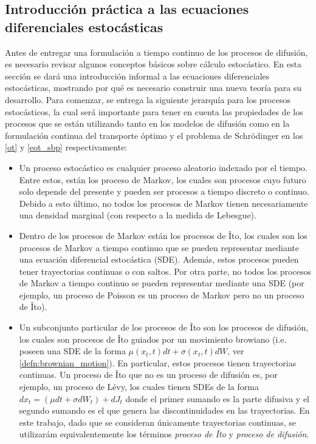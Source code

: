 \subsection{Introducción práctica a las ecuaciones diferenciales estocásticas}
\label{dm/continuous_dm/sdes_introduction}


Antes de entregar una formulación a tiempo continuo de los procesos de difusión, es necesario revisar algunos conceptos básicos sobre cálculo estocástico. En esta sección se dará una introducción informal a las ecuaciones diferenciales estocásticas, mostrando por qué es necesario construir una nueva teoría para su desarrollo. Para comenzar, se entrega la siguiente jerarquía para los procesos estocásticos, la cual será importante para tener en cuenta las propiedades de los procesos que se están utilizando tanto en los modelos de difusión como en la formulación continua del transporte óptimo y el problema de Schrödinger en los \autoref{ot} y \autoref{eot_sbp} respectivamente:


\begin{itemize}
    \item Un proceso estocástico es cualquier proceso aleatorio indexado por el tiempo. Entre estos, están los proceso de Markov, los cuales son procesos cuyo futuro solo depende del presente y pueden ser procesos a tiempo discreto o continuo. Debido a esto último, no todos los procesos de Markov tienen necesariamente una densidad marginal (con respecto a la medida de Lebesgue).
    \item Dentro de los procesos de Markov están los procesos de Îto, los cuales son los procesos de Markov a tiempo continuo que se pueden representar mediante una ecuación diferencial estocástica (SDE). Además, estos procesos pueden tener trayectorias continuas o con saltos. Por otra parte, no todos los procesos de Markov a tiempo continuo se pueden representar mediante una SDE (por ejemplo, un proceso de Poisson es un proceso de Markov pero no un proceso de Îto).
    \item Un subconjunto particular de los procesos de Îto son los procesos de difusión, los cuales son procesos de Îto guiados por un movimiento browiano (i.e. poseen una SDE de la forma $\mu(x_t,t)dt+\sigma(x_t,t)dW$, ver \autoref{defn:brownian_motion}). En particular, estos procesos tienen trayectorias continuas. Un proceso de Îto que no es un proceso de difusión es, por ejemplo, un proceso de Lévy, los cuales tienen SDEs de la forma $dx_t = (\mu dt + \sigma dW_t) + dJ_t$ donde el primer sumando es la parte difusiva y el segundo sumando es el que genera las discontinuidades en las trayectorias. En este trabajo, dado que se consideran únicamente trayectorias continuas, se utilizarám equivalentemente los términos \textit{proceso de Îto} y \textit{proceso de difusión}.
\end{itemize}

